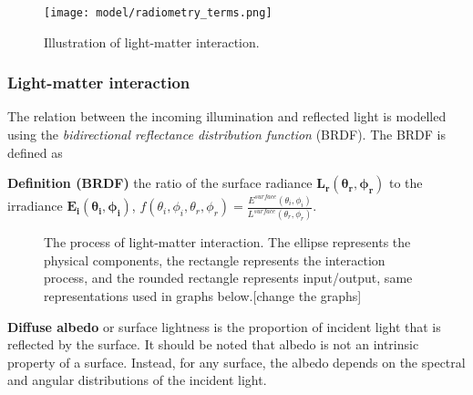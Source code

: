 \begin{figure}[!htbp]
\centering
\texttt{[image: model/radiometry\_terms.png]}
\caption{Illustration of light-matter interaction.}
\label{fig:radiometry_terms}
\end{figure}

\subsubsection{Light-matter interaction}
The relation between the incoming illumination and reflected light is modelled using the \textit{bidirectional reflectance distribution function} (BRDF). The BRDF is defined as

\noindent\textbf{Definition (BRDF)} the ratio of the surface radiance $\mathbf{L_r(\theta_r, \phi_r)}$ to the irradiance $\mathbf{E_i(\theta_i, \phi_i)}$, \ie $f(\theta_i, \phi_i, \theta_r, \phi_r)=\frac{E^{surface}(\theta_i, \phi_i)}{L^{surface}(\theta_r, \phi_r)}$.

\begin{figure}[!ht]
\centering
{}
\caption{The process of light-matter interaction. The ellipse represents the physical components, the rectangle represents the interaction process, and the rounded rectangle represents input/output, same representations used in graphs below.[change the graphs]}
\label{fig:light_matter_interact}
\end{figure}

\textbf{Diffuse albedo} or surface lightness is the proportion of incident light that is reflected by the surface. It should be noted that albedo is not an intrinsic property of a surface. Instead, for any surface, the albedo depends on the spectral and angular distributions of the incident light.

